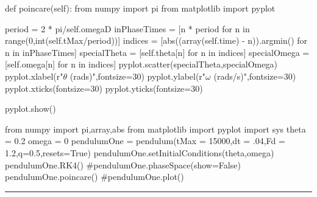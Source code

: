 \begin{codeexample}
\begin{VerbatimOut}{\listingFile}
    def poincare(self):
        from numpy import pi
        from matplotlib import pyplot
        
        period = 2 * pi/self.omegaD
        inPhaseTimes = [n * period for n in range(0,int(self.tMax/period))]
        indices = [abs((array(self.time) - n)).argmin() for n in inPhaseTimes]
        specialTheta = [self.theta[n] for n in indices]
        specialOmega = [self.omega[n] for n in indices]
        pyplot.scatter(specialTheta,specialOmega)
        pyplot.xlabel(r"$\theta$ (rads)",fontsize=30)
        pyplot.ylabel(r"$\omega$ (rads/s)",fontsize=30)
        pyplot.xticks(fontsize=30)
        pyplot.yticks(fontsize=30)

        pyplot.show()

from numpy import pi,array,abs
from matplotlib import pyplot
import sys
theta = 0.2
omega = 0
pendulumOne = pendulum(tMax = 15000,dt = .04,Fd = 1.2,q=0.5,resets=True)
pendulumOne.setInitialConditions(theta,omega)
pendulumOne.RK4()
#pendulumOne.phaseSpace(show=False)
pendulumOne.poincare()
#pendulumOne.plot()
\end{VerbatimOut}
\end{codeexample}
\else
\noindent\rule{4 in}{0.01 in}
\fi


